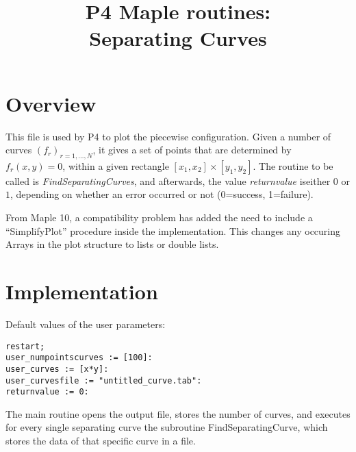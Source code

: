 \documentclass[a4paper,10pt]{article}
\title{P4 Maple routines:\\Separating Curves}
\author{}
\date{}
\begin{document}
\maketitle

\section{Overview}

This file is used by P4 to plot the piecewise configuration. Given a number of curves $(f_r)_{r=1,\dots,N}$, it gives a set of points that are determined by $f_r(x,y)=0$, within a given rectangle $[x_1,x_2]\times[y_1,y_2]$. The routine to be called is \emph{FindSeparatingCurves}, and afterwards, the value \emph{returnvalue} iseither $0$ or $1$, depending on whether an error occurred or not (0=success, 1=failure).

From Maple 10, a compatibility problem has added the need to include a ``SimplifyPlot'' procedure inside the implementation. This changes any occuring Arrays in the plot structure to lists or double lists.

\section{Implementation}

Default values of the user parameters:

\begin{lstlisting}[name=p4gcf]
restart;
user_numpointscurves := [100]:
user_curves := [x*y]:
user_curvesfile := "untitled_curve.tab":
returnvalue := 0:
\end{lstlisting}

The main routine opens the output file, stores the number of curves,
and executes for every single separating curve the subroutine FindSeparatingCurve,
which stores the data of that specific curve in a file.
\end{document}

